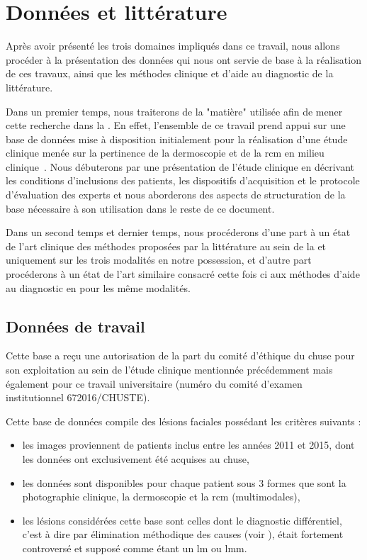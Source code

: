 \chapter{Données et littérature}
\label{chap:chapter_31}
\chapterintro
Après avoir présenté les trois domaines impliqués dans ce travail, nous allons procéder à la présentation des données qui nous ont servie de base à la réalisation de ces travaux, ainsi que les méthodes clinique et d'aide au diagnostic de la littérature.\par

Dans un premier temps, nous traiterons de la "matière" utilisée afin de mener cette recherche dans la . En effet, l'ensemble de ce travail prend appui sur une base de données mise à disposition initialement pour la réalisation d'une étude clinique menée sur la pertinence de la dermoscopie et de la \gls{rcm} en milieu clinique~\cite{Cinotti2018}. Nous débuterons par une présentation de l'étude clinique en décrivant les conditions d'inclusions des patients, les dispositifs d'acquisition et le protocole d'évaluation des experts et nous aborderons des aspects de structuration de la base nécessaire à son utilisation dans le reste de ce document.\par

Dans un second temps et dernier temps, nous procéderons d'une part à un état de l'art clinique des méthodes proposées par la littérature au sein de la  et uniquement sur les trois modalités en notre possession, et d'autre part procéderons à un état de l'art similaire consacré cette fois ci aux méthodes d'aide au diagnostic en  pour les même modalités.\par
\newpage

\section{Données de travail}
\label{sec:clinical_data}
Cette base a reçu une autorisation de la part du comité d'éthique du \gls{chuse} pour son exploitation au sein de l'étude clinique mentionnée précédemment mais également pour ce travail universitaire (numéro du comité d'examen institutionnel 672016/CHUSTE).\par

Cette base de données compile des lésions faciales possédant les critères suivants :
\begin{itemize}
    \item les images proviennent de patients inclus entre les années 2011 et 2015, dont les données ont exclusivement été acquises au \gls{chuse},
    \item les données sont disponibles pour chaque patient sous 3 formes que sont la photographie clinique, la dermoscopie et la \gls{rcm} (multimodales),
    \item les lésions considérées cette base sont celles dont le diagnostic différentiel, c'est à dire par élimination méthodique des causes (voir
    ), était fortement controversé et supposé comme étant un \gls{lm} ou \gls{lmm}.
\end{itemize}\par

